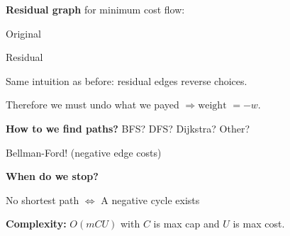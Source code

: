 \documentclass{beamer}
\begin{document}
\begin{frame}[fragile]
\textbf{Residual graph} for minimum cost flow:

\vspace{1cm}

Original

\begin{center}
\end{center}

\vspace{1cm}

Residual

\begin{center}
\end{center}

\end{frame}

\begin{frame}[fragile]

Same intuition as before: residual edges reverse choices.

\vspace{0.5cm}

Therefore we must undo what we payed $\Rightarrow \text{weight } = -w$.

\vspace{0.5cm}

\textbf{How to we find paths?} BFS? DFS? Dijkstra? Other?

\pause

\vspace{0.5cm}

Bellman-Ford! (negative edge costs)

\vspace{0.5cm}

\textbf{When do we stop?} 

\pause

\vspace{0.5cm}

No shortest path $\Leftrightarrow$ A negative cycle exists

\vspace{0.5cm}

\textbf{Complexity:} $O(m C U)$  with $C$ is max cap and $U$ is max cost.

\end{frame}
\end{document}
